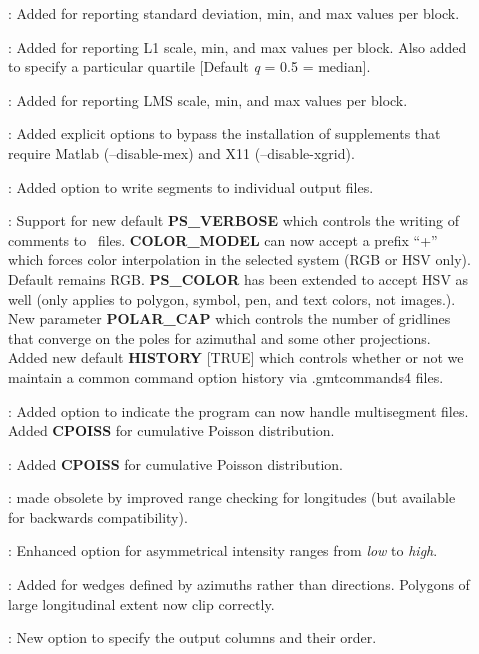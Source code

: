 \begin{description}
\item []: Added  for reporting standard deviation, min, and max values per block.
\item []: Added  for reporting L1 scale, min, and max values per block.
Also added  to specify a particular quartile [Default \emph{q} = 0.5 = median].
\item []: Added  for reporting LMS scale, min, and max values per block.
\item []: Added explicit options to bypass the installation of supplements
that require Matlab (--disable-mex) and X11 (--disable-xgrid).
\item []: Added  option to write segments to individual output files.
\item []: Support for new default \textbf{PS\_VERBOSE} which controls the
writing of comments to \PS\ files.  \textbf{COLOR\_MODEL} can now accept a prefix ``+'' which
forces color interpolation in the selected system (RGB or HSV only).  Default remains RGB.
\textbf{PS\_COLOR} has been extended to accept HSV as well (only applies to
polygon, symbol, pen, and text colors, not images.).  New parameter \textbf{POLAR\_CAP} which
controls the number of gridlines that converge on the poles for azimuthal and some other projections.
Added new default \textbf{HISTORY} [TRUE] which controls whether or not we maintain a common command option
history via .gmtcommands4 files.
\item []: Added option  to indicate the program can now handle multisegment files.
Added \textbf{CPOISS} for cumulative Poisson distribution.
\item []: Added \textbf{CPOISS} for cumulative Poisson distribution.
\item []:  made obsolete by improved range checking for longitudes (but available for
backwards compatibility).
\item []: Enhanced  option for asymmetrical intensity ranges from \emph{low} to \emph{high}.
\item []: Added  for wedges defined by azimuths rather than directions.  Polygons of large
longitudinal extent now clip correctly.
\item []: New option  to specify the output columns and their order.
\end{description}

